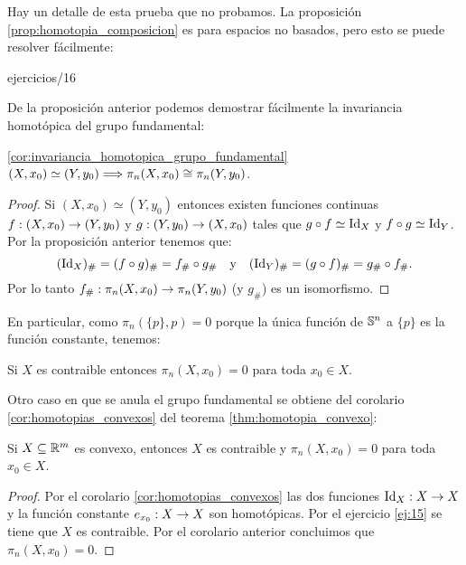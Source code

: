 \documentclass[../../topologia_algebraica]{subfiles}
\begin{document}
Hay un detalle de esta prueba que no probamos. La proposici\'on \ref{prop:homotopia_composicion} es
para espacios no basados, pero esto se puede resolver f\'acilmente:

{ejercicios/16} %

De la proposici\'on anterior podemos demostrar f\'acilmente la invariancia homot\'opica del grupo
fundamental:

\begin{cor}\ref{cor:invariancia_homotopica_grupo_fundamental}
	$(X,x_0)\simeq(Y,y_0) \Longrightarrow \pi_n(X,x_0)\cong\pi_n(Y,y_0)$.
\end{cor}
\begin{proof}
	Si $(X,x_0)\simeq(Y,y_0)$ entonces existen funciones continuas $f:(X,x_0)\rightarrow(Y,y_0)$ y
	$g:(Y,y_0)\rightarrow(X,x_0)$ tales que $g\circ f\simeq\text{Id}_X$ y $f\circ g\simeq\text{Id}_Y$. Por la
	proposici\'on anterior tenemos que:
	\[
		(\text{Id}_X)_{\#}=(f\circ g)_{\#}=f_{\#}\circ g_{\#} \quad\text{y}\quad
		(\text{Id}_Y)_{\#}=(g\circ f)_{\#}=g_{\#}\circ f_{\#}.
	\]
	Por lo tanto $f_{\#}:\pi_n(X,x_0)\rightarrow\pi_n(Y,y_0)$ (y $g_{\#}$) es un isomorfismo.
\end{proof}

En particular, como $\pi_n(\{p\},p)=0$ porque la \'unica funci\'on de $\mathbb{S}^n$ a $\{p\}$ es la
funci\'on constante, tenemos:

\begin{cor}
	Si $X$ es contraible entonces $\pi_n(X,x_0)=0$ para toda $x_0\in X$.
\end{cor}

Otro caso en que se anula el grupo fundamental se obtiene del corolario \ref{cor:homotopias_convexos}
del teorema \ref{thm:homotopia_convexo}:

\begin{cor}
	Si $X\subseteq\mathbb{R}^m$ es convexo, entonces $X$ es contraible y $\pi_n(X,x_0)=0$ para toda
	$x_0\in X$.
\end{cor}
\begin{proof}
	Por el corolario \ref{cor:homotopias_convexos} las dos funciones $\text{Id}_X:X\rightarrow X$
	y la funci\'on constante $e_{x_0}:X\rightarrow X$ son homot\'opicas. Por el ejercicio
	\ref{ej:15} se tiene que $X$ es contraible. Por el corolario anterior concluimos
	que $\pi_n(X,x_0)=0$.
\end{proof}
\end{document}

